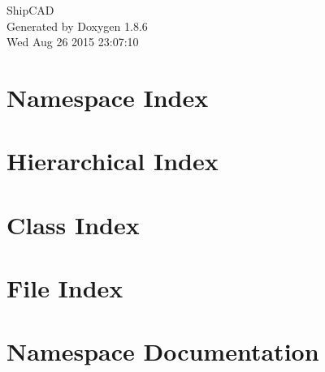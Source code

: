 \documentclass[twoside]{book}
\newcommand{\clearemptydoublepage}{%
  \newpage{\pagestyle{empty}\cleardoublepage}%
}
\begin{document}
\hypersetup{pageanchor=false}
\begin{titlepage}
\vspace*{7cm}
\begin{center}%
{\Large Ship\-C\-A\-D }\\
\vspace*{1cm}
{\large Generated by Doxygen 1.8.6}\\
\vspace*{0.5cm}
{\small Wed Aug 26 2015 23:07:10}\\
\end{center}
\end{titlepage}
\clearemptydoublepage
\tableofcontents
\clearemptydoublepage
{}
\hypersetup{pageanchor=true}

\chapter{Namespace Index}

\chapter{Hierarchical Index}

\chapter{Class Index}

\chapter{File Index}

\chapter{Namespace Documentation}


\end{document}
